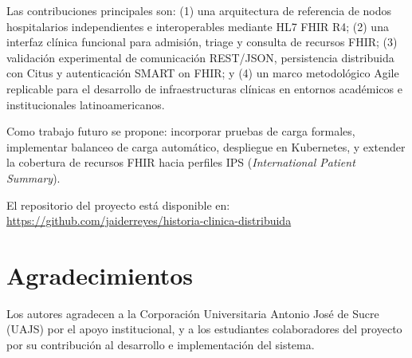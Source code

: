 \documentclass[conference]{IEEEtran}
\begin{document}
Las contribuciones principales son: (1) una arquitectura de referencia
de nodos hospitalarios independientes e interoperables mediante HL7
FHIR R4; (2) una interfaz cl\'inica funcional para admisi\'on, triage
y consulta de recursos FHIR; (3) validaci\'on experimental de
comunicaci\'on REST/JSON, persistencia distribuida con Citus y
autenticaci\'on SMART on FHIR; y (4) un marco metodol\'ogico Agile
replicable para el desarrollo de infraestructuras cl\'inicas en
entornos acad\'emicos e institucionales latinoamericanos.

Como trabajo futuro se propone: incorporar pruebas de carga formales,
implementar balanceo de carga autom\'atico, despliegue en Kubernetes,
y extender la cobertura de recursos FHIR hacia perfiles IPS
(\textit{International Patient Summary}).

El repositorio del proyecto est\'a disponible en:
\url{https://github.com/jaiderreyes/historia-clinica-distribuida}

\section*{Agradecimientos}

Los autores agradecen a la Corporaci\'on Universitaria Antonio Jos\'e
de Sucre (UAJS) por el apoyo institucional, y a los estudiantes
colaboradores del proyecto por su contribuci\'on al
desarrollo e implementaci\'on del sistema.
\end{document}
